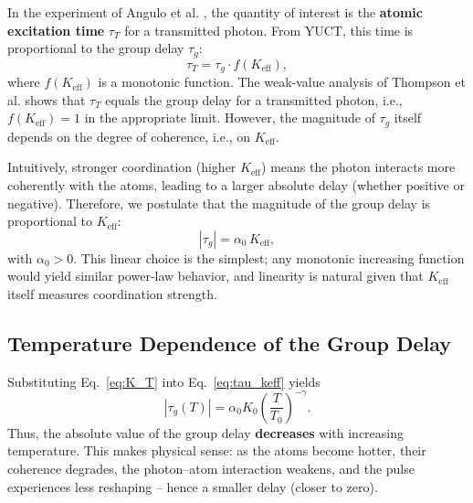 \documentclass[12pt,a4paper]{article}
\newcommand{\Keff}{K_{\mathrm{eff}}}
\begin{document}
	In the experiment of Angulo et al. \cite{Angulo2024}, the quantity of interest is the \textbf{atomic excitation time} \(\tau_T\) for a transmitted photon. From YUCT, this time is proportional to the group delay \(\tau_g\):
	\begin{equation}
		\tau_T = \tau_g \cdot f(\Keff),
		\label{eq:tau_relation}
	\end{equation}
	where \(f(\Keff)\) is a monotonic function. The weak-value analysis of Thompson et al. \cite{Thompson2023} shows that \(\tau_T\) equals the group delay for a transmitted photon, i.e., \(f(\Keff)=1\) in the appropriate limit. However, the magnitude of \(\tau_g\) itself depends on the degree of coherence, i.e., on \(\Keff\).
	
	Intuitively, stronger coordination (higher \(\Keff\)) means the photon interacts more coherently with the atoms, leading to a larger absolute delay (whether positive or negative). Therefore, we postulate that the magnitude of the group delay is proportional to \(\Keff\):
	\begin{equation}
		|\tau_g| = \alpha_0 \, \Keff,
		\label{eq:tau_keff}
	\end{equation}
	with \(\alpha_0 > 0\). This linear choice is the simplest; any monotonic increasing function would yield similar power-law behavior, and linearity is natural given that \(\Keff\) itself measures coordination strength.
	
	\subsection{Temperature Dependence of the Group Delay}
	
	Substituting Eq.~\eqref{eq:K_T} into Eq.~\eqref{eq:tau_keff} yields
	\begin{equation}
		|\tau_g(T)| = \alpha_0 K_0 \left(\frac{T}{T_0}\right)^{-\gamma}.
	\end{equation}
	Thus, the absolute value of the group delay \textbf{decreases} with increasing temperature. This makes physical sense: as the atoms become hotter, their coherence degrades, the photon–atom interaction weakens, and the pulse experiences less reshaping – hence a smaller delay (closer to zero).
	
\end{document}
